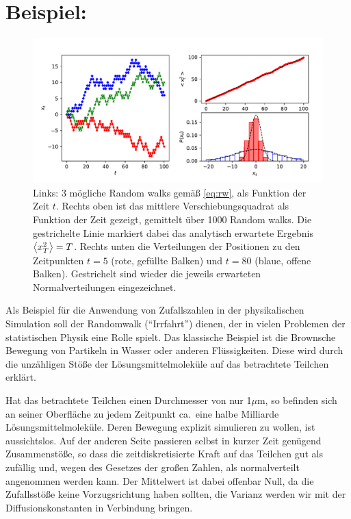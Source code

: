 \section{Beispiel: }
\label{sec:rw}

\begin{figure}
  \centering
  \includegraphics[width=\textwidth]{plots/rw}
  \caption{Links: 3 mögliche Random walks gemäß \eqref{eq:rw}, als
    Funktion der Zeit $t$. Rechts oben ist das mittlere
    Verschiebungsquadrat als Funktion der Zeit gezeigt, gemittelt über
    1000 Random walks. Die gestrichelte Linie markiert dabei das
    analytisch erwartete Ergebnis $\left\langle{x_T^2}\right\rangle=T$. Rechts unten
    die Verteilungen der Positionen zu den Zeitpunkten $t=5$ (rote,
    gefüllte Balken) und $t=80$ (blaue, offene Balken). Gestrichelt sind
    wieder die jeweils erwarteten Normalverteilungen eingezeichnet.}
  \label{fig:rw}
\end{figure}

Als Beispiel für die Anwendung von Zufallszahlen in der physikalischen
Simulation soll der Randomwalk ("`Irrfahrt"') dienen, der in vielen
Problemen der statistischen Physik eine Rolle spielt. Das klassische
Beispiel ist die Brownsche Bewegung von Partikeln in Wasser oder
anderen Flüssigkeiten. Diese wird durch die unzähligen Stöße der
Lösungsmittelmoleküle auf das betrachtete Teilchen erklärt.

Hat das betrachtete Teilchen einen Durchmesser von nur 1$\mu$m, so
befinden sich an seiner Oberfläche zu jedem Zeitpunkt ca.\ eine halbe
Milliarde Lösungsmittelmoleküle. Deren Bewegung explizit simulieren zu
wollen, ist aussichtslos. Auf der anderen Seite passieren selbst in
kurzer Zeit genügend Zusammenstöße, so dass die zeitdiskretisierte
Kraft auf das Teilchen gut als zufällig und, wegen des Gesetzes der
großen Zahlen, als normalverteilt angenommen werden kann. Der Mittelwert
ist dabei offenbar Null, da die Zufallsstöße keine Vorzugsrichtung
haben sollten, die Varianz werden wir mit der Diffusionskonstanten in
Verbindung bringen.

